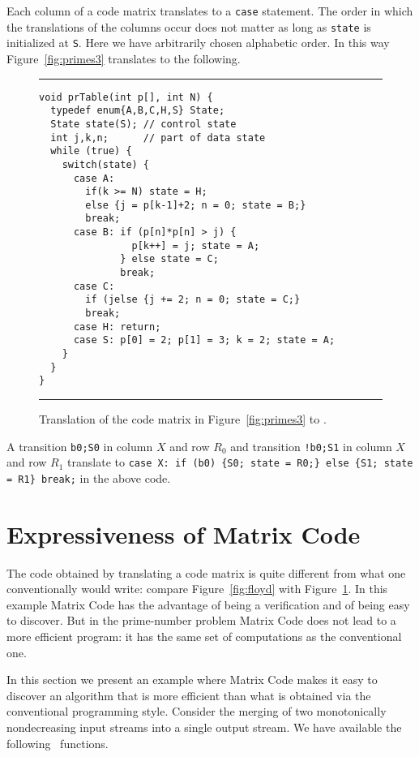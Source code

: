 \documentclass[preprint,11pt]{elsarticle}
\begin{document}
Each column of a code matrix translates
to a \verb"case" statement.
The order in which the translations of the columns
occur does not matter as long as \verb"state"
is initialized at \verb"S".
Here we have arbitrarily chosen alphabetic order.
In this way Figure~\ref{fig:primes3} translates to
the following.

\begin{figure}[htbp]
\hrule \vspace{0.1in}
\begin{center}
\begin{minipage}{3in}
{\footnotesize
\begin{verbatim}
void prTable(int p[], int N) {
  typedef enum{A,B,C,H,S} State;
  State state(S); // control state
  int j,k,n;      // part of data state
  while (true) {
    switch(state) {
      case A:
        if(k >= N) state = H;
        else {j = p[k-1]+2; n = 0; state = B;}
        break;
      case B: if (p[n]*p[n] > j) {
                p[k++] = j; state = A;
              } else state = C;
              break;
      case C:
        if (jelse {j += 2; n = 0; state = C;}
        break;
      case H: return;
      case S: p[0] = 2; p[1] = 3; k = 2; state = A;
    }
  }
}
\end{verbatim}
} \end{minipage}
\end{center}
\caption{\label{fig:primesCM}
Translation of the code matrix
in Figure~\ref{fig:primes3} to \cpp.
}
\vspace{0.1in}
\hrule
\end{figure}
A transition {\tt b0;S0} in column $X$ and row $R_0$ and
transition {\tt !b0;S1} in column $X$ and row $R_1$
translate to
{\tt case X: if (b0) \{S0; state = R0;\}
else \{S1; state = R1\} break;} in the above code.

\section{Expressiveness of Matrix Code}
\label{sec:expressiveness}

The code obtained by translating a code matrix
is quite different from what one conventionally would write:
compare Figure~\ref{fig:floyd} with
Figure~\ref{fig:primesCM}.
In this example Matrix Code has the advantage of being
a verification and of being easy to discover.
But in the prime-number problem
Matrix Code does not lead to a more efficient program:
it has the same set of computations as the conventional one.

In this section we present an example where Matrix Code
makes it easy to discover an algorithm that is
more efficient than what is obtained via the conventional
programming style.
Consider the merging of two
monotonically nondecreasing input streams
into a single output stream.
We have available the following \cpp\ functions.
\end{document}

